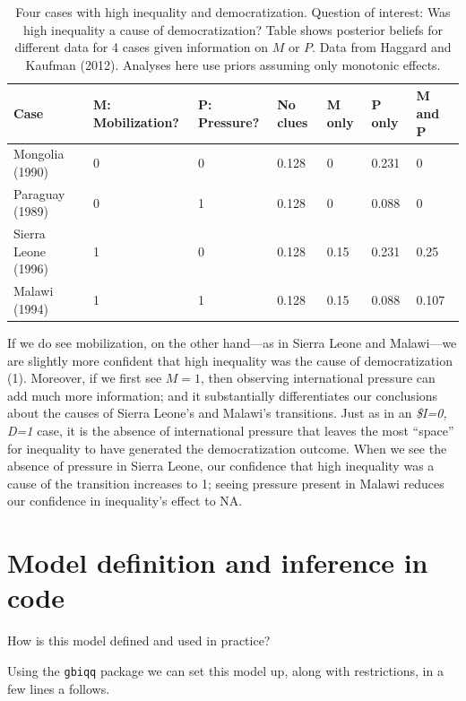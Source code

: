 \documentclass[12pt,]{book}
\begin{document}
\begin{table}[t]

\caption{\label{tab:HK8cases2}Four cases with high inequality and  democratization. Question of interest: Was high inequality a cause of democratization? Table shows posterior beliefs for different data for 4 cases given information on $M$ or $P$. Data from Haggard and Kaufman (2012). Analyses here use priors assuming only monotonic effects.}
\centering
\begin{tabular}{l|l|l|l|l|l|l}
\hline
Case & M: Mobilization? & P: Pressure? & No clues & M only & P only & M and P\\
\hline
Mongolia (1990) & 0 & 0 & 0.128 & 0 & 0.231 & 0\\
\hline
Paraguay (1989) & 0 & 1 & 0.128 & 0 & 0.088 & 0\\
\hline
Sierra Leone (1996) & 1 & 0 & 0.128 & 0.15 & 0.231 & 0.25\\
\hline
Malawi (1994) & 1 & 1 & 0.128 & 0.15 & 0.088 & 0.107\\
\hline
\end{tabular}
\end{table}

If we do see mobilization, on the other hand---as in Sierra Leone and Malawi---we are slightly more confident that high inequality was the cause of democratization (1). Moreover, if we first see \(M=1\), then observing international pressure can add much more information; and it substantially differentiates our conclusions about the causes of Sierra Leone's and Malawi's transitions. Just as in an \emph{\$I=0, D=1} case, it is the absence of international pressure that leaves the most ``space'' for inequality to have generated the democratization outcome. When we see the absence of pressure in Sierra Leone, our confidence that high inequality was a cause of the transition increases to 1; seeing pressure present in Malawi reduces our confidence in inequality's effect to NA.

\hypertarget{model-definition-and-inference-in-code}{%
\section{Model definition and inference in code}\label{model-definition-and-inference-in-code}}

How is this model defined and used in practice?

Using the \texttt{gbiqq} package we can set this model up, along with restrictions, in a few lines a follows.
\end{document}
